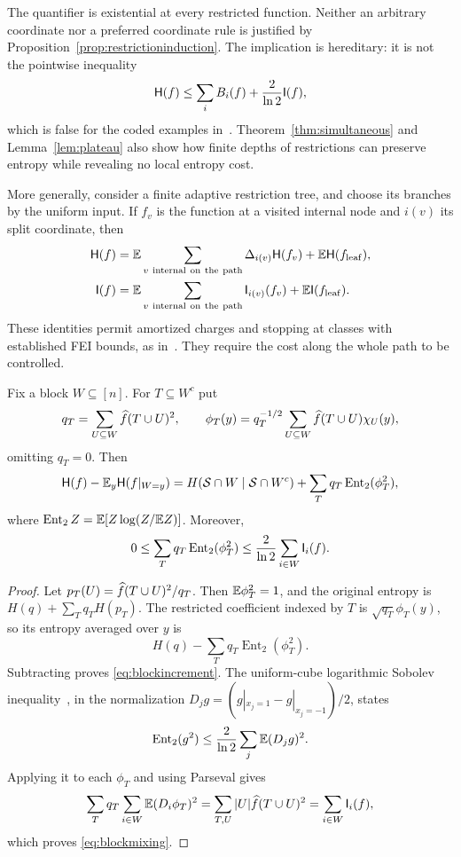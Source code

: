 The quantifier is existential at every restricted function.
Neither an arbitrary coordinate nor a preferred coordinate rule
is justified by Proposition~\ref{prop:restrictioninduction}.
The implication is hereditary: it is not the pointwise
inequality
\[
 \mathsf H(f)\le\sum_iB_i(f)+\frac2{\ln2}\mathsf I(f),
\]
which is false for the coded examples in~\cite{BrainErasure}.
Theorem~\ref{thm:simultaneous} and Lemma~\ref{lem:plateau}
also show how finite depths of restrictions can preserve entropy
while revealing no local entropy cost.

More generally, consider a finite adaptive restriction tree, and
choose its branches by the uniform input. If $f_v$ is the function
at a visited internal node and $i(v)$ its split coordinate, then
\begin{align}
 \mathsf H(f)&=\mathbb E\sum_{v\ {\rm internal\ on\ the\ path}}
               \Delta_{i(v)}\mathsf H(f_v)
              +\mathbb E\mathsf H(f_{\rm leaf}),\label{eq:treetelescopeH}\\
 \mathsf I(f)&=\mathbb E\sum_{v\ {\rm internal\ on\ the\ path}}
               \mathsf I_{i(v)}(f_v)
              +\mathbb E\mathsf I(f_{\rm leaf}).\label{eq:treetelescopeI}
\end{align}
These identities permit amortized charges and stopping at classes
with established FEI bounds, as in~\cite{GMP26}. They require the
cost along the whole path to be controlled.

\begin{proposition}\label{prop:blockincrement}
Fix a block $W\subseteq[n]$. For $T\subseteq W^c$ put
\[
 q_T=\sum_{U\subseteq W}\widehat{f}(T\cup U)^2,\qquad
 \phi_T(y)=q_T^{-1/2}
       \sum_{U\subseteq W}\widehat{f}(T\cup U)\chi_U(y),
\]
omitting $q_T=0$. Then
\begin{equation}\label{eq:blockincrement}
 \mathsf H(f)-\mathbb E_y\mathsf H(f|_{W=y})
 =H(\mathcal S\cap W\mid\mathcal S\cap W^c)
   +\sum_Tq_T\operatorname{Ent}_2(\phi_T^2),
\end{equation}
where
$\operatorname{Ent}_2 Z=\mathbb E[Z\log(Z/\mathbb E Z)]$. Moreover,
\begin{equation}\label{eq:blockmixing}
 0\le\sum_Tq_T\operatorname{Ent}_2(\phi_T^2)
 \le\frac2{\ln2}\sum_{i\in W}\mathsf I_i(f).
\end{equation}
\end{proposition}

\begin{proof}
Let $p_T(U)=\widehat{f}(T\cup U)^2/q_T$. Then
$\mathbb E\phi_T^2=1$, and the original entropy is
$H(q)+\sum_Tq_TH(p_T)$. The restricted coefficient indexed by
$T$ is $\sqrt{q_T}\phi_T(y)$, so its entropy averaged over $y$
is
\[
 H(q)-\sum_Tq_T\operatorname{Ent}_2(\phi_T^2).
\]
Subtracting proves \eqref{eq:blockincrement}. The uniform-cube
logarithmic Sobolev inequality~\cite{OD14}, in the normalization
$D_jg=(g|_{x_j=1}-g|_{x_j=-1})/2$, states
\[
 \operatorname{Ent}_2(g^2)
 \le\frac2{\ln2}\sum_j\mathbb E(D_jg)^2.
\]
Applying it to each $\phi_T$ and using Parseval gives
\[
 \sum_Tq_T\sum_{i\in W}\mathbb E(D_i\phi_T)^2
 =\sum_{T,U}|U|\widehat{f}(T\cup U)^2
 =\sum_{i\in W}\mathsf I_i(f),
\]
which proves \eqref{eq:blockmixing}.
\end{proof}

